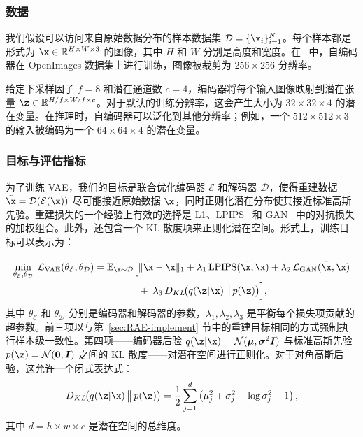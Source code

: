 \documentclass[../../book-main_zh.tex]{subfiles}
\begin{document}
\subsubsection{数据}
我们假设可以访问来自原始数据分布的样本数据集 $\mathcal{D} = \{\x_i\}_{i=1}^N$。每个样本都是形式为 $\x \in \mathbb{R}^{H \times W \times 3}$ 的图像，其中 $H$ 和 $W$ 分别是高度和宽度。在~\citep{rombach2022high} 中，自编码器在 OpenImages 数据集上进行训练，图像被裁剪为 $256 \times 256$ 分辨率。

给定下采样因子 $f = 8$ 和潜在通道数 $c = 4$，编码器将每个输入图像映射到潜在张量 $\z \in \mathbb{R}^{H/f \times W/f \times c}$。对于默认的训练分辨率，这会产生大小为 $32 \times 32 \times 4$ 的潜在变量。在推理时，自编码器可以泛化到其他分辨率；例如，一个 $512 \times 512 \times 3$ 的输入被编码为一个 $64 \times 64 \times 4$ 的潜在变量。

\subsubsection{目标与评估指标}
为了训练 VAE，我们的目标是联合优化编码器 $\mathcal{E}$ 和解码器 $\mathcal{D}$，使得重建数据 $\tilde{\x} = \mathcal{D}(\mathcal{E}(\x))$ 尽可能接近原始数据 $\x$，同时正则化潜在分布使其接近标准高斯先验。重建损失的一个经验上有效的选择是 L1、LPIPS~\citep{zhang2018unreasonable} 和 GAN~\citep{goodfellow2014generative} 中的对抗损失的加权组合。此外，还包含一个 KL 散度项来正则化潜在空间。形式上，训练目标可以表示为：

\begin{equation}
\begin{split}
\min_{\theta_{\mathcal{E}}, \theta_{\mathcal{D}}} \; \mathcal{L}_{\mathrm{VAE}}(\theta_{\mathcal{E}}, \theta_{\mathcal{D}}) = \mathbb{E}_{\x \sim \mathcal{D}} \Big[
    &\|\tilde{\x} - \x\|_1 + \lambda_1 \, \mathrm{LPIPS}(\tilde{\x}, \x) + \lambda_2 \, \mathcal{L}_{\mathrm{GAN}}(\tilde{\x}, \x) \\
    &+ \; \lambda_3 \, D_{KL}\!\big(q(\z | \x) \,\big\|\, p(\z)\big)
\Big],
\end{split}
\label{eq:vae_loss}
\end{equation}
其中 $\theta_{\mathcal{E}}$ 和 $\theta_{\mathcal{D}}$ 分别是编码器和解码器的参数，$\lambda_1, \lambda_2, \lambda_3$ 是平衡每个损失项贡献的超参数。前三项以与第~\ref{sec:RAE-implement} 节中的重建目标相同的方式强制执行样本级一致性。第四项——编码器后验 $q(\z | \x) = \mathcal{N}(\boldsymbol{\mu}, \boldsymbol{\sigma}^2 \boldsymbol{I})$ 与标准高斯先验 $p(\z) = \mathcal{N}(\boldsymbol{0}, \boldsymbol{I})$ 之间的 KL 散度——对潜在空间进行正则化。对于对角高斯后验，这允许一个闭式表达式：
\begin{equation}
    D_{KL}\!\big(q(\z | \x) \,\big\|\, p(\z)\big) = \frac{1}{2} \sum_{j=1}^{d} \left( \mu_j^2 + \sigma_j^2 - \log \sigma_j^2 - 1 \right),
\end{equation}
其中 $d = h \times w \times c$ 是潜在空间的总维度。
\end{document}
